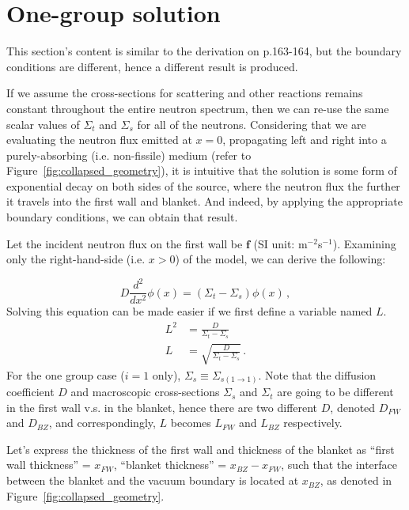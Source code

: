 \documentclass[a4paper, 12pt]{article}
\newcommand{\ve}[1]{\boldsymbol{#1}}
\newcommand{\flux}[0]{\ve{f}}
\begin{document}
\section{One-group solution}\label{sec:OneGroup}
This section's content is similar to the derivation on p.163-164, but the boundary conditions are different, hence a different result is produced.

If we assume the cross-sections for scattering and other reactions remains constant throughout the entire neutron spectrum, then we can re-use the same scalar values of $\Sigma_t$ and $\Sigma_s$ for all of the neutrons. Considering that we are evaluating the neutron flux emitted at $x=0$, propagating left and right into a purely-absorbing (i.e. non-fissile) medium (refer to Figure~\ref{fig:collapsed_geometry}), it is intuitive that the solution is some form of exponential decay on both sides of the source, where the neutron flux the further it travels into the first wall and blanket. And indeed, by applying the appropriate boundary conditions, we can obtain that result.

Let the incident neutron flux on the first wall be $\flux $ (SI unit: m$^{-2}$s$^{-1}$). Examining only the right-hand-side (i.e. $x>0$) of the model, we can derive the following:

\begin{equation}\label{eq:OneGroupDiffusionEqDifferentialForm}
    D \frac{d^2}{dx^2}\phi(x) = (\Sigma_t - \Sigma_s) \phi(x)\,,
\end{equation}
Solving this equation can be made easier if we first define a variable named $L$.
\begin{align}
    L^2 &=      \frac{D}{\Sigma_t-\Sigma_s}\nonumber\\
    L   &=\sqrt{\frac{D}{\Sigma_t-\Sigma_s}}\,.\label{eq:LDefinition}
\end{align}
For the one group case ($i = 1$ only), $\Sigma_s\equiv \Sigma_{s(1\rightarrow1)}$.
Note that the diffusion coefficient $D$ and macroscopic cross-sections $\Sigma_s$ and $\Sigma_t$ are going to be different in the first wall v.s. in the blanket, hence there are two different $D$, denoted $D_{FW}$ and $D_{BZ}$, and correspondingly, $L$ becomes $L_{FW}$ and $L_{BZ}$ respectively.

Let's express the thickness of the first wall and thickness of the blanket as ``first wall thickness'' = $x_{FW}$, ``blanket thickness'' = $x_{BZ} - x_{FW}$, such that the interface between the blanket and the vacuum boundary is located at $x_{BZ}$, as denoted in Figure~\ref{fig:collapsed_geometry}.
\end{document}
